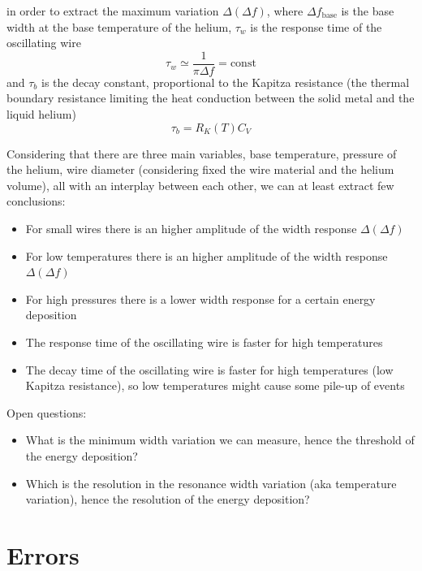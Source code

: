 \documentclass[a4paper,10pt]{article}
\begin{document}
in order to extract the maximum variation $\Delta (\Delta f)$, where $\Delta f_\mathrm{base}$ is the base width at the base temperature of the helium, $\tau_w$ is the response time of the oscillating wire
\begin{equation}
  \tau_w \simeq \frac{1}{\pi \Delta f} = \mathrm{const}
\end{equation}
and $\tau_b$ is the decay constant, proportional to the Kapitza resistance (the thermal boundary resistance limiting the heat conduction between the solid metal and the liquid helium)
\begin{equation}
  \tau_b = R_K(T) C_V
\end{equation}

Considering that there are three main variables, base temperature, pressure of the helium, wire diameter (considering fixed the wire material and the helium volume), all with an interplay between each other, we can at least extract few conclusions:
\begin{itemize}
  \item For small wires there is an higher amplitude of the width response $\Delta (\Delta f)$
  \item For low temperatures there is an higher amplitude of the width response $\Delta (\Delta f)$
  \item For high pressures there is a lower width response for a certain energy deposition
  \item The response time of the oscillating wire is faster for high temperatures 
  \item The decay time of the oscillating wire is faster for high temperatures (low Kapitza resistance), so low temperatures might cause some pile-up of events

\end{itemize}

Open questions:
\begin{itemize}

  \item What is the minimum width variation we can measure, hence the threshold of the energy deposition? 
  \item Which is the resolution in the resonance width variation (aka temperature variation), hence the resolution of the energy deposition?

\end{itemize}



\section{Errors}
\end{document}

